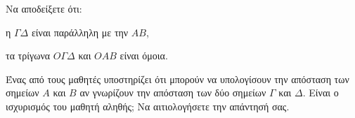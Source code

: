 \begin{alist}
\item Να αποδείξετε ότι:
    \begin{rlist}
    \item η $\Gamma\Delta$ είναι παράλληλη με την $AB$, 
    \item τα τρίγωνα $O\Gamma\Delta$ και $OAB$ είναι όμοια. 
    \end{rlist}
\item Ένας από τους μαθητές υποστηρίζει ότι μπορούν να υπολογίσουν την απόσταση των σημείων $A$ και $B$ αν γνωρίζουν την απόσταση των δύο σημείων $\Gamma$ και $\Delta$.
    Είναι ο ισχυρισμός του μαθητή αληθής; Να αιτιολογήσετε την απάντησή σας. 
\end{alist}